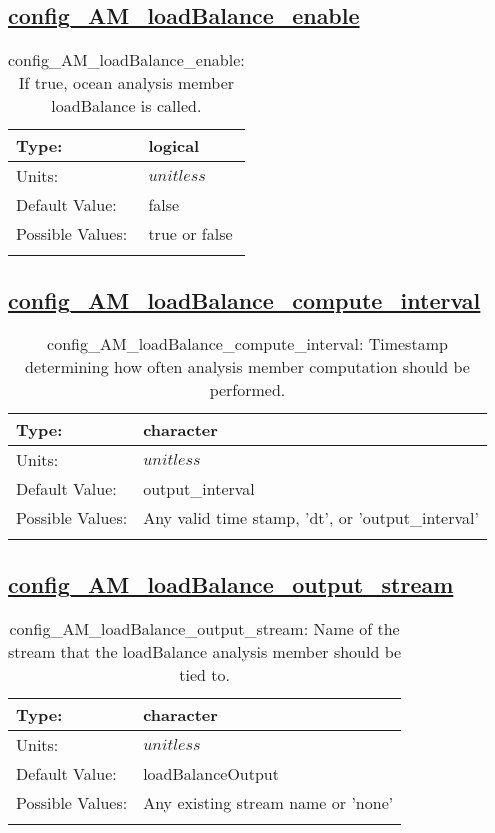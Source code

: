 \subsection[config\_AM\_loadBalance\_enable]{\hyperref[sec:nm_tab_AM_loadBalance]{config\_AM\_loadBalance\_enable}}
\label{subsec:nm_sec_config_AM_loadBalance_enable}
\begin{center}
\begin{longtable}{| p{2.0in} || p{4.0in} |}
    \hline
    Type: & logical \\
    \hline
    Units: & $unitless$ \\
    \hline
    Default Value: & false \\
    \hline
    Possible Values: & true or false \\
    \hline
    \caption{config\_AM\_loadBalance\_enable: If true, ocean analysis member loadBalance is called.}
\end{longtable}
\end{center}
\subsection[config\_AM\_loadBalance\_compute\_interval]{\hyperref[sec:nm_tab_AM_loadBalance]{config\_AM\_loadBalance\_compute\_interval}}
\label{subsec:nm_sec_config_AM_loadBalance_compute_interval}
\begin{center}
\begin{longtable}{| p{2.0in} || p{4.0in} |}
    \hline
    Type: & character \\
    \hline
    Units: & $unitless$ \\
    \hline
    Default Value: & output\_interval \\
    \hline
    Possible Values: & Any valid time stamp, 'dt', or 'output\_interval' \\
    \hline
    \caption{config\_AM\_loadBalance\_compute\_interval: Timestamp determining how often analysis member computation should be performed.}
\end{longtable}
\end{center}
\subsection[config\_AM\_loadBalance\_output\_stream]{\hyperref[sec:nm_tab_AM_loadBalance]{config\_AM\_loadBalance\_output\_stream}}
\label{subsec:nm_sec_config_AM_loadBalance_output_stream}
\begin{center}
\begin{longtable}{| p{2.0in} || p{4.0in} |}
    \hline
    Type: & character \\
    \hline
    Units: & $unitless$ \\
    \hline
    Default Value: & loadBalanceOutput \\
    \hline
    Possible Values: & Any existing stream name or 'none' \\
    \hline
    \caption{config\_AM\_loadBalance\_output\_stream: Name of the stream that the loadBalance analysis member should be tied to.}
\end{longtable}
\end{center}
